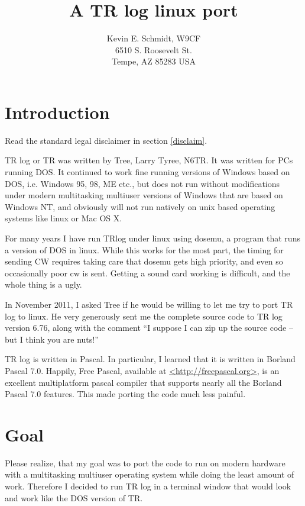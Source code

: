 \documentclass[12pt]{article}
\begin{document}
\title{A TR log linux port}
\author{
Kevin E. Schmidt, W9CF\\
6510 S. Roosevelt St.\\
Tempe, AZ 85283 USA\\
}
\date{}
\maketitle
\vskip 2cm
\tableofcontents
\vskip 2cm
\section{Introduction}
Read the standard legal disclaimer in section \ref{disclaim}.
\vskip 0.5cm

TR log or TR was written by Tree, Larry Tyree, N6TR. It was written for PCs
running DOS. It continued to work fine running versions of Windows based
on DOS, i.e. Windows 95, 98, ME etc., but does not run without
modifications under modern
multitasking multiuser versions of Windows that are based on Windows NT,
and obviously will not run natively on unix based operating systems like
linux or Mac OS X.

For many years I have run TRlog under linux using dosemu, a program that
runs a version of DOS in linux. While this works for the most part,
the timing for sending CW requires taking care that dosemu gets high
priority, and even so occasionally poor cw is sent. Getting a sound card
working is difficult, and the whole thing is a ugly.

In November 2011, I asked Tree if he would be willing to let me try to
port TR log to linux. He very generously sent me the complete source
code to TR log version 6.76, along with the comment ``I suppose I can
zip up the source code -- but I think you are nuts!''

TR log is written in Pascal. In particular, I learned that it
is written in Borland Pascal 7.0. Happily, Free Pascal,
available at
\url{<http://freepascal.org>},
is an excellent multiplatform pascal compiler that supports
nearly all the Borland Pascal 7.0 features. This made porting
the code much less painful.

\section{Goal}

Please realize, that my goal was to port the code to run on modern
hardware with a multitasking multiuser operating system while doing
the least
amount of work. Therefore I decided to run TR log in a terminal window
that would look and work like the DOS version of TR.
\end{document}
